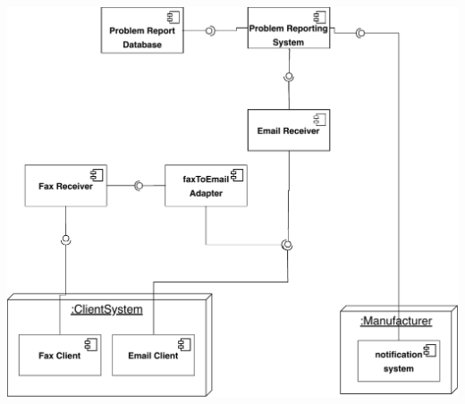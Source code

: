 \documentclass[a4paper, 10pt]{article}
\begin{document}
\begin{enumerate}
    \includegraphics[width=\linewidth]{task4.pdf}
\end{enumerate}
\end{document}
